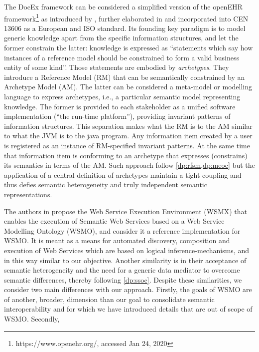 \documentclass[sort&compress,preprint,authoryear,3p,twocolumn]{elsarticle}
\begin{document}
The DocEx framework can be considered a simplified version of the
openEHR framework\footnote{https://www.openehr.org/, accessed Jan 24,
  2020} as introduced by \cite{Beale:2001vz}, further elaborated in
\citep{Beale2007a, Beale2008a, Beale2007, Beale2008, Beale2007b, Beale2007c}
and incorporated into CEN 13606 as a European and ISO standard. Its
founding key paradigm is to model generic knowledge apart from the
specific information structures, and let the former constrain the
latter: knowledge is expressed as ``statements which say how instances
of a reference model should be constrained to form a valid business
entity of some kind''. Those statements are embodied by
\emph{archetypes}. They introduce a Reference Model (RM) that can be
semantically constrained by an Archetype Model (AM). The latter can be
considered a meta-model or modelling language to express archetypes,
i.e., a particular semantic model representing knowledge. The former is
provided to each stakeholder as a unified software implementation (``the
run-time platform''), providing invariant patterns of information
structures. This separation makes what the RM is to the AM similar to
what the JVM is to the java program. Any information item created by a
user is registered as an instance of RM-specified invariant patterns. At
the same time that information item is conforming to an archetype that
expresses (constrains) its semantics in terms of the AM. Such approach
follow \cref{dp:rfsm,dp:meoc} but the application of a central
definition of archetypes maintain a tight coupling and thus defies
semantic heterogeneity and truly independent semantic representations.

The authors in \citep{Haller2005} propose the Web Service Execution
Environment (WSMX) that enables the execution of Semantic Web Services
based on a Web Service Modelling Ontology (WSMO), and consider it a
reference implementation for WSMO. It is meant as a means for automated
discovery, composition and execution of Web Services which are based on
logical inference-mechanisms, and in this way similar to our objective.
Another similarity is in their acceptance of semantic heterogeneity and
the need for a generic data mediator to overcome semantic differences,
thereby following \cref{dp:ssoc}. Despite these similarities, we
consider two main differences with our approach. Firstly, the goals of
WSMO are of another, broader, dimension than our goal to consolidate
semantic interoperability and for which we have introduced details that
are out of scope of WSMO. Secondly,
\end{document}
